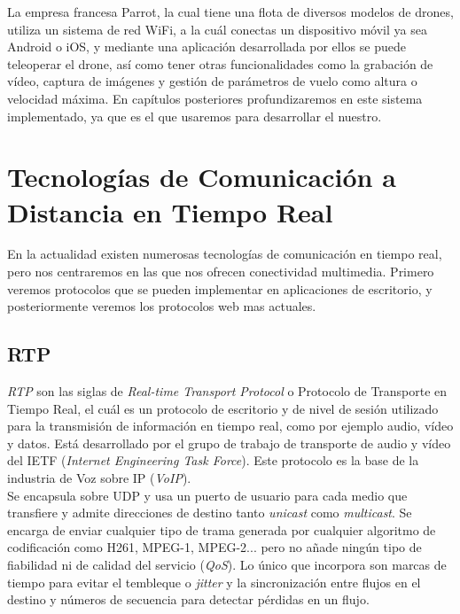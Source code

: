 La empresa francesa Parrot, la cual tiene una flota de diversos modelos de drones, utiliza un sistema de red WiFi, a la cuál conectas un dispositivo móvil ya sea Android o iOS, y mediante una aplicación desarrollada por ellos se puede teleoperar el drone, así como tener otras funcionalidades como la grabación de vídeo, captura de imágenes y gestión de parámetros de vuelo como altura o velocidad máxima. En capítulos posteriores profundizaremos en este sistema implementado, ya que es el que usaremos para desarrollar el nuestro.\\
 
\section{Tecnologías de Comunicación a Distancia en Tiempo Real}

En la actualidad  existen numerosas tecnologías de comunicación en tiempo real, pero nos centraremos en las que nos ofrecen conectividad multimedia. Primero veremos protocolos que se pueden implementar en aplicaciones de escritorio, y posteriormente veremos los protocolos web mas actuales.\\

\subsection{RTP}

\emph{RTP} son las siglas de \emph{Real-time Transport Protocol} o Protocolo de Transporte en Tiempo Real, el cuál es un protocolo de escritorio y de nivel de sesión utilizado para la transmisión de información en tiempo real, como por ejemplo audio, vídeo y datos. Está desarrollado por el grupo de trabajo de transporte de audio y vídeo del IETF (\emph{Internet Engineering Task Force}). Este protocolo es la base de la industria de Voz sobre IP (\emph{VoIP}).\\

Se encapsula sobre UDP y usa un puerto de usuario para cada medio que transfiere y admite direcciones de destino tanto \emph{unicast} como \emph{multicast}. Se encarga de enviar cualquier tipo de trama generada por cualquier algoritmo de codificación como H261, MPEG-1, MPEG-2... pero no añade ningún tipo de fiabilidad ni de calidad del servicio (\emph{QoS}). Lo único que incorpora son marcas de tiempo para evitar el tembleque o \emph{jitter} y la sincronización entre flujos en el destino y números de secuencia para detectar pérdidas en un flujo.\\

